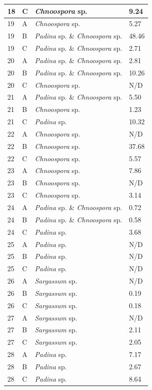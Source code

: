 \documentclass[12pt]{article}
\begin{document}
\begin{longtable}{ | p{2cm} | p{2cm} | p{3cm} | p{3.5cm} |}
\hline
18&C&\emph{Chnoospora }sp.&9.24
\\
\hline
19&A&\emph{Chnoospora }sp.&5.27
\\
\hline
19&B&\emph{Padina} sp. \& \emph{Chnoospora} sp.&48.46
\\
\hline
19&C&\emph{Padina} sp. \& \emph{Chnoospora }sp.&2.71
\\
\hline
20&A&\emph{Padina} sp. \& \emph{Chnoospora }sp.&2.81
\\
\hline
20&B&\emph{Padina} sp. \& \emph{Chnoospora }sp.&10.26
\\
\hline
20&C&\emph{Chnoospora }sp.&N/D\\
\hline
21&A&\emph{Padina} sp. \& \emph{Chnoospora} sp.&5.50
\\
\hline
21&B&\emph{Chnoospora }sp.&1.23
\\
\hline
21&C&\emph{Padina} sp.&10.32
\\
\hline
22&A&\emph{Chnoospora }sp.&N/D\\
\hline
22&B&\emph{Chnoospora} sp.&37.68
\\
\hline
22&C&\emph{Chnoospora} sp.&5.57
\\
\hline
23&A&\emph{Chnoospora }sp.&7.86
\\
\hline
23&B&\emph{Chnoospora} sp.&N/D\\
\hline
23&C&\emph{Chnoospora }sp.&3.14
\\
\hline
24&A&\emph{Padina} sp. \& \emph{Chnoospora }sp.&0.72
\\
\hline
24&B&\emph{Padina} sp. \& \emph{Chnoospora} sp.&0.58
\\
\hline
24&C&\emph{Padina} sp.&3.68
\\
\hline
25&A&\emph{Padina} sp.&N/D\\
\hline
25&B&\emph{Padina} sp.&N/D\\
\hline
25&C&\emph{Padina} sp.&N/D\\
\hline
26
&A&\emph{Sargassum} sp.&N/D\\
\hline
26
&B&\emph{Sargassum} sp.&0.19\\
\hline
26
&C&\emph{Sargassum} sp.&0.18\\
\hline
27
&A&\emph{Sargassum} sp.&N/D\\
\hline
27
&B&\emph{Sargassum} sp.&2.11\\
\hline
27
&C&\emph{Sargassum} sp.&2.05\\
\hline
28
&A&\emph{Padina} sp.&7.17\\
\hline
28
&B&\emph{Padina} sp.&2.67\\
\hline
28
&C&\emph{Padina} sp.&8.64\\

\end{longtable}
\end{document}
